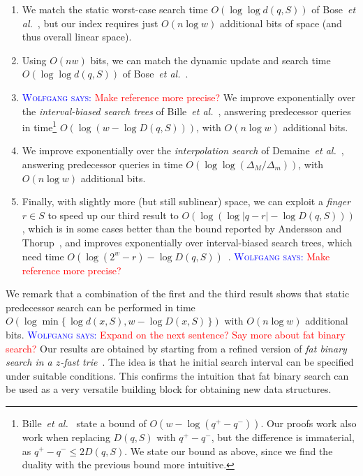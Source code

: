 \documentclass[a4paper,11pt]{article}
\newcommand{\etal}{\emph{et al.}\xspace}
\newcommand{\?}{\mskip1.5mu}
\newcommand{\aremark}[3]{\textcolor{blue}{\textsc{#1 #2:}}
  \textcolor{red}{\textsf{#3}}}
\newcommand{\wolfgang}[2][says]{\aremark{Wolfgang}{#1}{#2}}
\begin{document}
\begin{enumerate}
  \item We match the static worst-case search time 
  $O(\log\log d(q, S))$
  of Bose~\etal~\cite{BoseDoDuHoMo13}, but our index requires 
  just $O(n\log w)$ additional bits of space (and thus overall 
  linear space).
  \item Using $O(nw)$ bits, we can match the dynamic
  update and search time $O(\log\log d(q, S))$
  of Bose~\etal~\cite{BoseDoDuHoMo13}.
  \item 
  \wolfgang{Make reference more precise?}
  We improve exponentially over the \emph{interval-biased search
  trees} of Bille~\etal~\cite{BilleLaRaSaSaWe15}, answering 
  predecessor queries in time\footnote{Bille~\etal~\cite{BilleLaRaSaSaWe15} 
  state a bound of $O(w - \log(q^+ - q^-))$. Our 
  proofs work also work when replacing $D(q, S)$ with $q^+ - q^-$, but 
  the difference is immaterial, as $q^+ - q^-\leq 2D(q, S)$. We state
  our bound as above, since
  we find the duality with the previous bound more intuitive.} 
  $O(\log(w - \log D(q, S)))$, with 
  $O(n\log w)$ additional bits.
  \item We improve exponentially over the \emph{interpolation
  search} of Demaine~\etal~\cite{DemaineJoPa04}, answering
  predecessor queries in time 
  $O(\log\log(\Delta_M / \Delta_m))$, with
  $O(n\log w)$ additional bits.
  \item Finally, with slightly more (but still sublinear) space,
  we can exploit a \emph{finger} $r \in S$ to speed up our third 
  result to $O\left(\log(\log|q - r| - \log D(q, S))\right)$, which is in
  some cases better than the bound reported
  by Andersson and Thorup~\cite{AnderssonTh07}, and improves 
  exponentially over interval-biased search trees, which need 
  time  
  $O\left(\log(2^w - r) - \log D(q, S)\right)$~\cite{BilleLaRaSaSaWe15}.
  \wolfgang{Make reference more precise?}
\end{enumerate}
We remark that a combination of the first
and the third result shows that static predecessor 
search can be performed in time  
$O(\log \min \{\,\log d(x,S),w-\log D(x,S)\,\})$ 
with $O(n \log w)$ additional bits. 
\wolfgang{Expand on the next sentence? Say more about fat binary search?}
Our 
results are obtained by starting from a refined version of
\emph{fat binary search in a $z$-fast trie}~\cite{BelazzouguiBoPaVi09}.
The idea is that
he initial search interval can be specified under 
suitable conditions. This confirms the intuition that fat
binary search can be used as a very versatile building block 
for obtaining new data structures.
\end{document}
